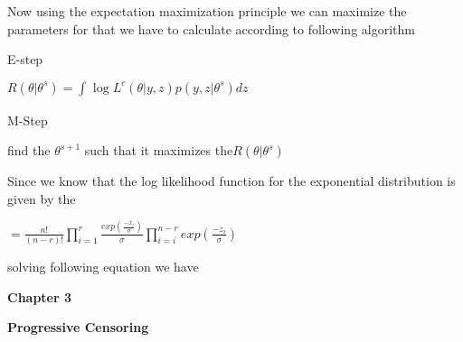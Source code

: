 \documentclass[12pt]{article}
\begin{document}
 Now using the expectation maximization principle we can maximize the parameters 
 for that we have to calculate according to following algorithm
 \begin{center}
 	\begin{flushleft}
 	E-step\\
 	\end{flushleft}
 	$R(\theta|\theta^s)=\int_{}{} \log L^c(\theta|y,z) p(y,z|\theta^s) dz$\\
 	\begin{flushleft}
 	M-Step\\
 	\end{flushleft}
 	 find the $\theta^{s+1}$ such that it maximizes the$ R(\theta|\theta^s)$\\
 \end{center}
 Since we know that the log likelihood function for the exponential distribution is given by the
 \begin{center}
 	$=\frac{n!}{(n-r)!} \prod_{i=1}^{r} \frac{exp(\frac{-x_{i}}{\sigma})}{\sigma} \prod_{i=i}^{n-r}exp(\frac{-z_{i}}{\sigma})$\\
 	\begin{flushleft}
 	solving following equation we have
 	\end{flushleft}
 	
 \end{center}
 
 \newpage
 \begin{flushleft}
 	\textbf{\Large Chapter 3}
 \end{flushleft}
 \vspace{0.1cm}
 \begin{flushleft}
 	\textbf{\Large Progressive Censoring}
 \end{flushleft}
\end{document}
